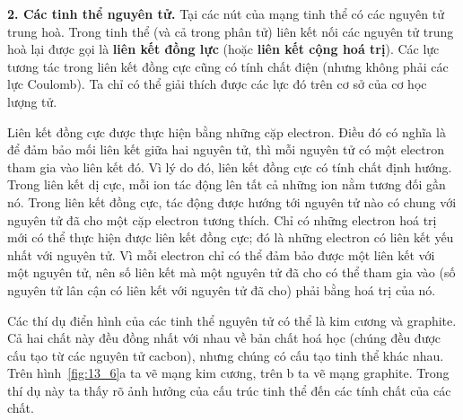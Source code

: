 \textbf{2. Các tinh thể nguyên tử.} Tại các nút của mạng tinh thể có các nguyên tử trung hoà. Trong tinh thể (và cả trong phân tử) liên kết nối các nguyên tử trung hoà lại được gọi là \textbf{liên kết đồng lực} (hoặc \textbf{liên kết cộng hoá trị}). Các lực tương tác trong liên kết đồng cực cũng có tính chất điện (nhưng không phải các lực Coulomb). Ta chỉ có thể giải thích được các lực đó trên cơ sở của cơ học lượng tử.


Liên kết đồng cực được thực hiện bằng những cặp electron. Điều đó có nghĩa là để đảm bảo mối liên kết giữa hai nguyên tử, thì mỗi nguyên tử có một electron tham gia vào liên kết đó. Vì lý do đó, liên kết đồng cực có tính chất định hướng. Trong liên kết dị cực, mỗi ion tác động lên tất cả những ion nằm tương đối gần nó. Trong liên kết đồng cực, tác động được hướng tới nguyên tử nào có chung với nguyên tử đã cho một cặp electron tương thích. Chỉ có những electron hoá trị mới có thể thực hiện được liên kết đồng cực; đó là những electron có liên kết yếu nhất với nguyên tử. Vì mỗi electron chỉ có thể đảm bảo được một liên kết với một nguyên tử, nên số liên kết mà một nguyên tử đã cho có thể tham gia vào (số nguyên tử lân cận có liên kết với nguyên tử đã cho) phải bằng hoá trị của nó.


Các thí dụ điển hình của các tinh thể nguyên tử có thể là kim cương và graphite. Cả hai chất này đều đồng nhất với nhau về bản chất hoá học (chúng đều được cấu tạo từ các nguyên tử cacbon), nhưng chúng có cấu tạo tinh thể khác nhau. Trên hình~\ref{fig:13_6}a ta vẽ mạng kim cương, trên b ta vẽ mạng graphite. Trong thí dụ này ta thấy rõ ảnh hưởng của cấu trúc tinh thể đến các tính chất của các chất.

